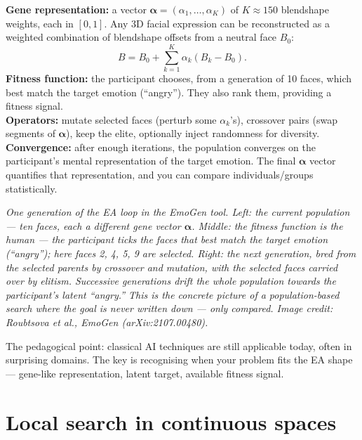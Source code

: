 \documentclass[11pt, a4paper]{article}
\begin{document}
\begin{exbox}
\textbf{Gene representation:} a vector $\boldsymbol{\alpha} = (\alpha_1, \dots, \alpha_K)$ of $K \approx 150$ blendshape weights, each in $[0, 1]$. Any 3D facial expression can be reconstructed as a weighted combination of blendshape offsets from a neutral face $B_0$:
\[
B = B_0 + \sum_{k=1}^{K} \alpha_k (B_k - B_0).
\]
\textbf{Fitness function:} the participant chooses, from a generation of 10 faces, which best match the target emotion (``angry''). They also rank them, providing a fitness signal.\\[0.3em]
\textbf{Operators:} mutate selected faces (perturb some $\alpha_k$'s), crossover pairs (swap segments of $\boldsymbol{\alpha}$), keep the elite, optionally inject randomness for diversity.\\[0.3em]
\textbf{Convergence:} after enough iterations, the population converges on the participant's mental representation of the target emotion. The final $\boldsymbol{\alpha}$ vector quantifies that representation, and you can compare individuals/groups statistically.
\end{exbox}

\begin{center}

\footnotesize\textit{One generation of the EA loop in the EmoGen tool. \emph{Left:} the current \emph{population} --- ten faces, each a different gene vector $\boldsymbol{\alpha}$. \emph{Middle:} the \emph{fitness function} is the human --- the participant ticks the faces that best match the target emotion (``angry''); here faces 2, 4, 5, 9 are selected. \emph{Right:} the \emph{next generation}, bred from the selected parents by crossover and mutation, with the selected faces carried over by \emph{elitism}. Successive generations drift the whole population towards the participant's latent ``angry.'' This is the concrete picture of a population-based search where the goal is never written down --- only compared. Image credit: Roubtsova et al., EmoGen (arXiv:2107.00480).}
\end{center}

The pedagogical point: classical AI techniques are still applicable today, often in surprising domains. The key is recognising when your problem fits the EA shape — gene-like representation, latent target, available fitness signal.

\section{Local search in continuous spaces}
\end{document}
